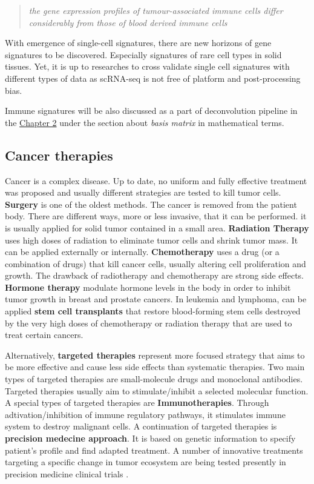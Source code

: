 \documentclass[12pt,]{book}
\theoremstyle{definition}
\theoremstyle{definition}
\theoremstyle{definition}
\theoremstyle{remark}
\begin{document}
\begin{quote}
\emph{the gene expression profiles of tumour-associated immune cells
differ considerably from those of blood derived immune cells}
\citep{Schelker2017}
\end{quote}

With emergence of single-cell signatures, there are new horizons of gene
signatures to be discovered. Especially signatures of rare cell types in
solid tissues. Yet, it is up to researches to cross validate single cell
signatures with different types of data as scRNA-seq is not free of
platform and post-processing bias.

Immune signatures will be also discussed as a part of deconvolution
pipeline in the \protect\hyperlink{methods}{Chapter 2} under the section
about \emph{basis matrix} in mathematical terms.

\hypertarget{cancer_Therapies}{%
\subsection{Cancer therapies}\label{cancer_Therapies}}

Cancer is a complex disease. Up to date, no uniform and fully effective
treatment was proposed and usually different strategies are tested to
kill tumor cells. \textbf{Surgery} is one of the oldest methods. The
cancer is removed from the patient body. There are different ways, more
or less invasive, that it can be performed. it is usually applied for
solid tumor contained in a small area. \textbf{Radiation Therapy} uses
high doses of radiation to eliminate tumor cells and shrink tumor mass.
It can be applied externally or internally. \textbf{Chemotherapy} uses a
drug (or a combination of drugs) that kill cancer cells, usually
altering cell proliferation and growth. The drawback of radiotherapy and
chemotherapy are strong side effects. \textbf{Hormone therapy } modulate
hormone levels in the body in order to inhibit tumor growth in breast
and prostate cancers. In leukemia and lymphoma, can be applied
\textbf{stem cell transplants} that restore blood-forming stem cells
destroyed by the very high doses of chemotherapy or radiation therapy
that are used to treat certain cancers.

Alternatively, \textbf{targeted therapies} represent more focused
strategy that aims to be more effective and cause less side effects than
systematic therapies. Two main types of targeted therapies are
small-molecule drugs and monoclonal antibodies. Targeted therapies
usually aim to stimulate/inhibit a selected molecular function. A
special types of targeted therapies are \textbf{Immunotherapies}.
Through adtivation/inhibition of immune regulatory pathways, it
stimulates immune system to destroy malignant cells. A continuation of
targeted therapies is \textbf{precision medecine approach}. It is based
on genetic information to specify patient's profile and find adapted
treatment. A number of innovative treatments targeting a specific change
in tumor ecosystem are being tested presently in precision medicine
clinical trials \citep{NCI2018}.
\end{document}

